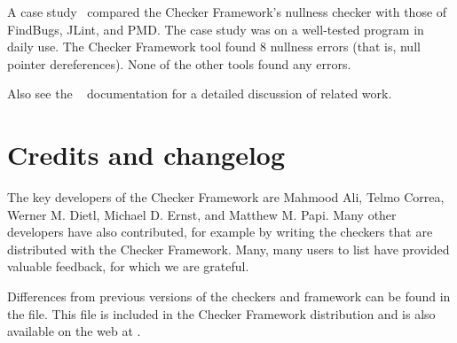 A case study~\cite[\S6]{PapiACPE2008} compared the Checker Framework's nullness
checker with those of FindBugs, JLint, and PMD\@.  The case study was on a
well-tested program in daily use.  The Checker Framework tool found 8
nullness errors (that is, null pointer dereferences).  None of the other
tools found any errors.

Also see the
~\cite{JSR308-2008-09-12}
documentation for a detailed discussion of related work.



\section{Credits and changelog\label{credits}}

The key developers of the Checker Framework are Mahmood Ali, Telmo Correa,
Werner M. Dietl, Michael D. Ernst, and Matthew M. Papi.
Many other developers have also contributed, for example by writing
the checkers that are distributed with the Checker Framework.
Many, many users to list have provided valuable feedback, for which we are
grateful.


Differences from previous versions of the checkers and framework can be found
in the  file.  This file is included in the
Checker Framework distribution and is also available on the web at
.






